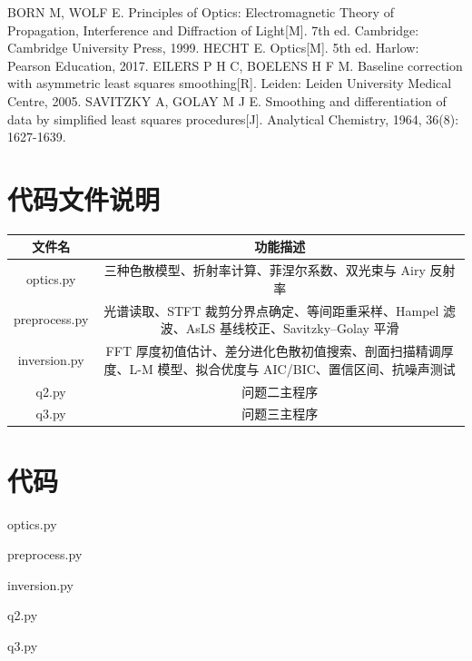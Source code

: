 \documentclass[withoutpreface,bwprint]{cumcmthesis}
\begin{document}
\newpage

\begin{thebibliography}{99}

 BORN M, WOLF E. Principles of Optics: Electromagnetic Theory of Propagation, Interference and Diffraction of Light[M]. 7th ed. Cambridge: Cambridge University Press, 1999.
 HECHT E. Optics[M]. 5th ed. Harlow: Pearson Education, 2017.
 EILERS P H C, BOELENS H F M. Baseline correction with asymmetric least squares smoothing[R]. Leiden: Leiden University Medical Centre, 2005.
 SAVITZKY A, GOLAY M J E. Smoothing and differentiation of data by simplified least squares procedures[J]. Analytical Chemistry, 1964, 36(8): 1627-1639.

\end{thebibliography}

\newpage

\begin{appendices}
\section{代码文件说明}
\begin{table}[H]
\centering
\begin{tabularx}{\textwidth}{CC}
\toprule
文件名 & 功能描述 \\
\midrule
optics.py & 三种色散模型、折射率计算、菲涅尔系数、双光束与 Airy 反射率 \\
preprocess.py & 光谱读取、STFT 裁剪分界点确定、等间距重采样、Hampel 滤波、AsLS 基线校正、Savitzky--Golay 平滑 \\
inversion.py & FFT 厚度初值估计、差分进化色散初值搜索、剖面扫描精调厚度、L-M 模型、拟合优度与 AIC/BIC、置信区间、抗噪声测试 \\
q2.py & 问题二主程序 \\
q3.py & 问题三主程序 \\
\bottomrule
\end{tabularx}
\label{tab:code-list}
\end{table}

\section{代码}
\noindent

optics.py


preprocess.py


inversion.py


q2.py


q3.py

\end{appendices}
\end{document}
